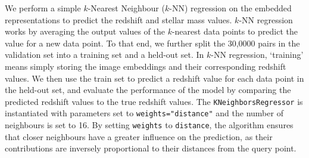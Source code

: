 \documentclass[a4paper,12pt]{article}
\begin{document}
We perform a simple $k$-Nearest Neighbour ($k$-NN) regression on the embedded representations to predict the redshift and stellar mass values. $k$-NN regression works by averaging the output values of the $k$-nearest data points to predict the value for a new data point. To that end, we further split the 30,0000 pairs in the validation set into a training set and a held-out set. In $k$-NN regression, `training' means simply storing the image embeddings and their corresponding redshift values. We then use the train set to predict a redshift value for each data point in the held-out set, and evaluate the performance of the model by comparing the predicted redshift values to the true redshift values. The \verb|KNeighborsRegressor| is instantiated with parameters set to \verb|weights="distance"| and the number of neighbours is set to 16. By setting \verb|weights| to \verb|distance|, the algorithm ensures that closer neighbours have a greater influence on the prediction, as their contributions are inversely proportional to their distances from the query point.



\end{document}
